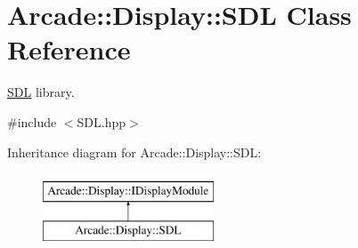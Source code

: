 \hypertarget{classArcade_1_1Display_1_1SDL}{}\section{Arcade\+::Display\+::S\+DL Class Reference}
\label{classArcade_1_1Display_1_1SDL}


\mbox{\hyperlink{classArcade_1_1Display_1_1SDL}{S\+DL}} library.  




{\ttfamily \#include $<$S\+D\+L.\+hpp$>$}

Inheritance diagram for Arcade\+::Display\+::S\+DL\+:\begin{figure}[H]
\begin{center}
\leavevmode
\includegraphics[height=2.000000cm]{classArcade_1_1Display_1_1SDL}
\end{center}
\end{figure}
